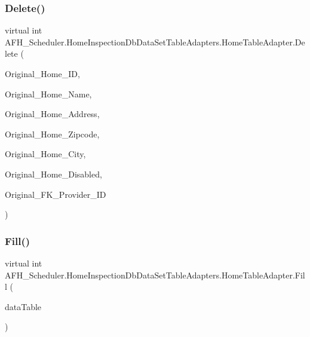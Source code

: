 \subsubsection{Delete()}
{\footnotesize\ttfamily virtual int A\+F\+H\+\_\+\+Scheduler.\+Home\+Inspection\+Db\+Data\+Set\+Table\+Adapters.\+Home\+Table\+Adapter.\+Delete (\begin{DoxyParamCaption}\item[{string}]{Original\+\_\+\+Home\+\_\+\+ID,  }\item[{string}]{Original\+\_\+\+Home\+\_\+\+Name,  }\item[{string}]{Original\+\_\+\+Home\+\_\+\+Address,  }\item[{string}]{Original\+\_\+\+Home\+\_\+\+Zipcode,  }\item[{string}]{Original\+\_\+\+Home\+\_\+\+City,  }\item[{bool}]{Original\+\_\+\+Home\+\_\+\+Disabled,  }\item[{global\+::\+System.\+Nullable$<$ int $>$}]{Original\+\_\+\+F\+K\+\_\+\+Provider\+\_\+\+ID }\end{DoxyParamCaption})\hspace{0.3cm}{\ttfamily [virtual]}}

\mbox{\label{class_a_f_h___scheduler_1_1_home_inspection_db_data_set_table_adapters_1_1_home_table_adapter_a923426e5be1d26e1f5061285675297be}} 
\subsubsection{Fill()}
{\footnotesize\ttfamily virtual int A\+F\+H\+\_\+\+Scheduler.\+Home\+Inspection\+Db\+Data\+Set\+Table\+Adapters.\+Home\+Table\+Adapter.\+Fill (\begin{DoxyParamCaption}\item[{\textbf{ Home\+Inspection\+Db\+Data\+Set.\+Home\+Data\+Table}}]{data\+Table }\end{DoxyParamCaption})\hspace{0.3cm}{\ttfamily [virtual]}}

\mbox{\label{class_a_f_h___scheduler_1_1_home_inspection_db_data_set_table_adapters_1_1_home_table_adapter_ad11356bcfc9d2a0109a2909c3dc8730b}} 
